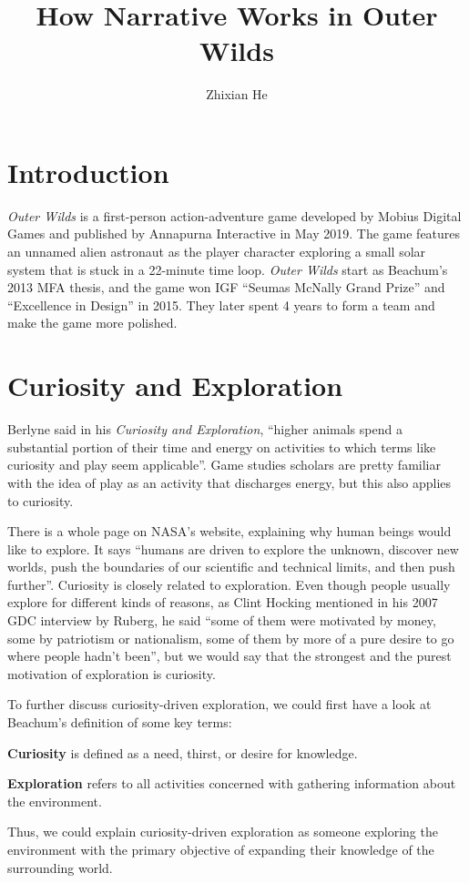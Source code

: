 \documentclass[doc, biblatex]{apa6}
\title{How Narrative Works in Outer Wilds}
\author{Zhixian He}
\affiliation{New York University}
\begin{document}
\maketitle
\section{Introduction}
\textit{Outer Wilds} is a first-person action-adventure game developed by Mobius
Digital Games and published by Annapurna Interactive in May 2019. The game
features an unnamed alien astronaut as the player character exploring a small
solar system that is stuck in a 22-minute time loop. \textit{Outer Wilds} start
as Beachum's 2013 MFA thesis\parencite{beachum2013outer}, and the game won IGF
``Seumas McNally Grand Prize'' and ``Excellence in Design'' in
2015\parencite{igf2015}. They later spent 4 years to form a team and make the
game more polished.

\section{Curiosity and Exploration}
Berlyne said in his \textit{Curiosity and Exploration}, ``higher animals spend a
substantial portion of their time and energy on activities to which terms like
curiosity and play seem applicable''\parencite{berlyne1966curiosity}. Game
studies scholars are pretty familiar with the idea of play as an activity that
discharges energy\parencite{huizinga2020homo}, but this also applies to
curiosity.

There is a whole page on NASA's website, explaining why human beings would like
to explore. It says ``humans are driven to explore the unknown, discover new
worlds, push the boundaries of our scientific and technical limits, and then
push further''\parencite{nasa}. Curiosity is closely related to
exploration. Even though people usually explore for different kinds of reasons,
as Clint Hocking mentioned in his 2007 GDC interview by Ruberg, he said ``some
of them were motivated by money, some by patriotism or nationalism, some of them
by more of a pure desire to go where people hadn't
been''\parencite{ruberg2007clint}, but we would say that the strongest and the
purest motivation of exploration is curiosity.

To further discuss curiosity-driven exploration, we could first have a look at
Beachum's definition of some key terms\parencite{beachum2013outer}:
\begin{APAitemize}
\item \textbf{Curiosity} is defined as a need, thirst, or desire for knowledge.
\item \textbf{Exploration} refers to all activities concerned with gathering
  information about the environment.
\end{APAitemize}
Thus, we could explain curiosity-driven exploration as someone exploring the
environment with the primary objective of expanding their knowledge of the
surrounding world.
\end{document}
